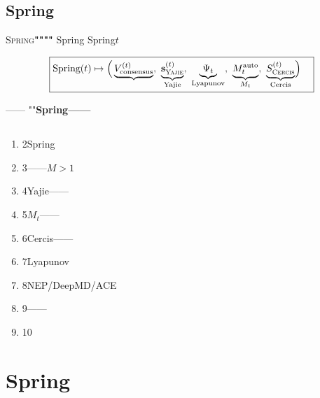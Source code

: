 \documentclass[12pt,a4paper]{article}
\theoremstyle{remark}
\newcommand{\Spring}{\textsc{Spring}}
\newcommand{\Yajie}{\textsc{Yajie}}
\newcommand{\Cercis}{\textsc{Cercis}}
\newcommand{\Mauto}{\ensuremath{M_t^{\text{auto}}}}
\newcommand{\Lyap}{\ensuremath{\Psi}}
\begin{document}
\subsection{Spring}

\Spring{}\textbf{""""}
Spring
Spring$t$

\begin{equation}\label{eq:spring_outputs}
    \boxed{
    \begin{aligned}
        \text{Spring}(t) \mapsto \Bigl(
            &\underbrace{V^{(t)}_{\text{consensus}}}_{\text{}},\ 
            \underbrace{\mathbf{s}_{\Yajie}^{(t)}}_{\text{Yajie}},\ 
            \underbrace{\Lyap_t}_{\text{Lyapunov}},\ 
            \underbrace{\Mauto}_{\text{$M_t$}},\ 
            \underbrace{S_{\Cercis}^{(t)}}_{\text{Cercis}}
        \Bigr)
    \end{aligned}}
\end{equation}

——\textit{}
""\textbf{Spring——}

\subsection{}

\begin{enumerate}[label=(\arabic*),itemsep=3pt]
    \item 2Spring
    \item 3——$M>1$
    \item 4Yajie——
    \item 5$M_t$——
    \item 6Cercis——
    \item 7Lyapunov
    \item 8NEP/DeepMD/ACE
    \item 9——
    \item 10
\end{enumerate}

\newpage

\section{Spring}

\subsection{}
\end{document}
